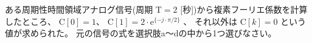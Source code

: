 ある周期性時間領域アナログ信号(周期 $\textrm{T} = 2$ [秒])から複素フーリエ係数を計算したところ、
$\textrm{C}[0] = 1$、
$\textrm{C}[1] = 2 \cdot \textrm{e}^{\{-j \cdot \pi/2 \}}$ 、
それ以外は $\textrm{C}[k] = 0$ という値が求められた。
元の信号の式を選択肢a〜dの中から1つ選びなさい。
